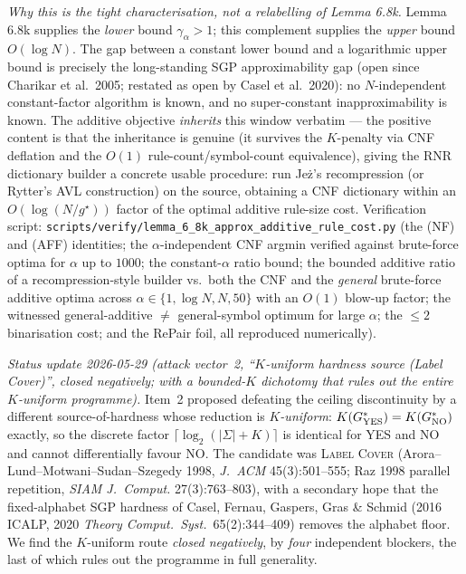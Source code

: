 \documentclass[
]{article}
\begin{document}
\emph{Why this is the tight characterisation, not a relabelling of
Lemma 6.8k.} Lemma 6.8k supplies the \emph{lower} bound
$\gamma_\alpha > 1$; this complement supplies the \emph{upper} bound
$O(\log N)$. The gap between a constant lower bound and a logarithmic
upper bound is precisely the long-standing SGP approximability gap
(open since Charikar et al.\ 2005; restated as open by Casel et al.\
2020): no $N$-independent constant-factor algorithm is known, and no
super-constant inapproximability is known. The additive objective
\emph{inherits} this window verbatim --- the positive content is that
the inheritance is genuine (it survives the $K$-penalty via CNF
deflation and the $O(1)$ rule-count/symbol-count equivalence), giving
the RNR dictionary builder a concrete usable procedure: run Je\.z's
recompression (or Rytter's AVL construction) on the source, obtaining a
CNF dictionary within an $O(\log(N/g^\star))$ factor of the optimal
additive rule-size cost. Verification script:
\texttt{scripts/verify/lemma\_6\_8k\_approx\_additive\_rule\_cost.py}
(the (NF) and (AFF) identities; the $\alpha$-independent CNF argmin
verified against brute-force optima for $\alpha$ up to $1000$; the
constant-$\alpha$ ratio bound; the bounded additive ratio of a
recompression-style builder vs.\ both the CNF and the \emph{general}
brute-force additive optima across $\alpha \in \{1, \log N, N, 50\}$
with an $O(1)$ blow-up factor; the witnessed general-additive $\neq$
general-symbol optimum for large $\alpha$; the $\leq 2$ binarisation
cost; and the RePair foil, all reproduced numerically).

\emph{Status update 2026-05-29 (attack vector~2, ``$K$-uniform
hardness source (Label Cover)'', closed negatively; with a
bounded-$K$ dichotomy that rules out the entire $K$-uniform
programme).} Item~2 proposed defeating the ceiling discontinuity by a
different source-of-hardness whose reduction is \emph{$K$-uniform}:
$K(G^*_{\rm YES}) = K(G^*_{\rm NO})$ exactly, so the discrete factor
$\lceil \log_2(|\Sigma| + K)\rceil$ is identical for YES and NO and
cannot differentially favour NO. The candidate was \textsc{Label
Cover} (Arora--Lund--Motwani--Sudan--Szegedy 1998, \emph{J.\ ACM}
45(3):501--555; Raz 1998 parallel repetition, \emph{SIAM J.\ Comput.}
27(3):763--803), with a secondary hope that the fixed-alphabet SGP
hardness of Casel, Fernau, Gaspers, Gras \& Schmid (2016 ICALP,
2020 \emph{Theory Comput.\ Syst.}\ 65(2):344--409) removes the
alphabet floor. We find the $K$-uniform route \emph{closed
negatively}, by \emph{four} independent blockers, the last of which
rules out the programme in full generality.
\end{document}

